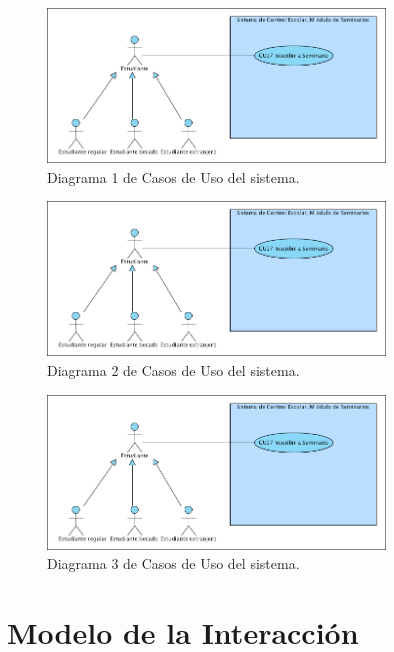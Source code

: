 \documentclass[oneside,10pt]{book}
\begin{document}
	\begin{figure}[htbp!]
		\centering
			\includegraphics[width=0.8\textwidth]{images/CasosDeUso}
		\caption{Diagrama 1 de Casos de Uso del sistema.}
	\end{figure}
	\begin{figure}[htbp!]
		\centering
			\includegraphics[width=0.8\textwidth]{images/CasosDeUso}
		\caption{Diagrama 2 de Casos de Uso del sistema.}
	\end{figure}
	\begin{figure}[htbp!]
		\centering
			\includegraphics[width=0.8\textwidth]{images/CasosDeUso}
		\caption{Diagrama 3 de Casos de Uso del sistema.}
	\end{figure}
	

\chapter{Modelo de la Interacción}



	
\end{document}
